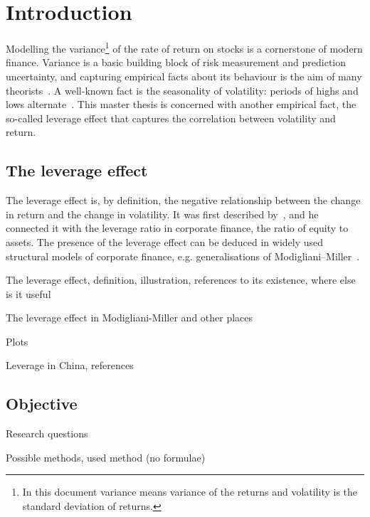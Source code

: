 \section{Introduction}

Modelling the variance\footnote{In this document variance means variance of the returns and volatility is the standard deviation of returns.} of the rate of return on stocks is a cornerstone of modern finance.
Variance is a basic building block of risk measurement and prediction uncertainty, and capturing empirical facts about its behaviour is the aim of many theorists~\citep{Christie1982}.
A well-known fact is the seasonality of volatility: periods of highs and lows alternate~\citep{schwert1989why}.
This master thesis is concerned with another empirical fact, the so-called leverage effect that captures the correlation between volatility and return.

\subsection{The leverage effect}

The leverage effect is, by definition, the negative relationship between the change in return and the change in volatility.
It was first described by~\citet{black1976studies}, and he connected it with the leverage ratio in corporate finance, the ratio of equity to assets.
The presence of the leverage effect can be deduced in widely used structural models of corporate finance, e.g. generalisations of Modigliani--Miller~\citep{Christie1982}.

The leverage effect, definition, illustration, references to its existence, where else is it useful

The leverage effect in Modigliani-Miller and other places

Plots

Leverage in China, references

\subsection{Objective}

Research questions

Possible methods, used method (no formulae)